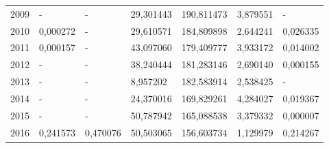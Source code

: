 \begin{table}
\begin{tabular}{p{1cm}p{2cm}p{2cm}p{2cm}p{2cm}p{2cm}p{2cm}}
 2009 &                - &                         - &                                          29,301443 &                     190,811473 &                       3,879551 &                           - \\
 2010 &         0,000272 &                         - &                                          29,610571 &                     184,809898 &                       2,644241 &                    0,026335 \\
 2011 &         0,000157 &                         - &                                          43,097060 &                     179,409777 &                       3,933172 &                    0,014002 \\
 2012 &                - &                         - &                                          38,240444 &                     181,283146 &                       2,690140 &                    0,000155 \\
 2013 &                - &                         - &                                           8,957202 &                     182,583914 &                       2,538425 &                           - \\
 2014 &                - &                         - &                                          24,370016 &                     169,829261 &                       4,284027 &                    0,019367 \\
 2015 &                - &                         - &                                          50,787942 &                     165,088538 &                       3,379332 &                    0,000007 \\
 2016 &         0,241573 &                  0,470076 &                                          50,503065 &                     156,603734 &                       1,129979 &                    0,214267 \\
\bottomrule
\end{tabular}
\end{table}
